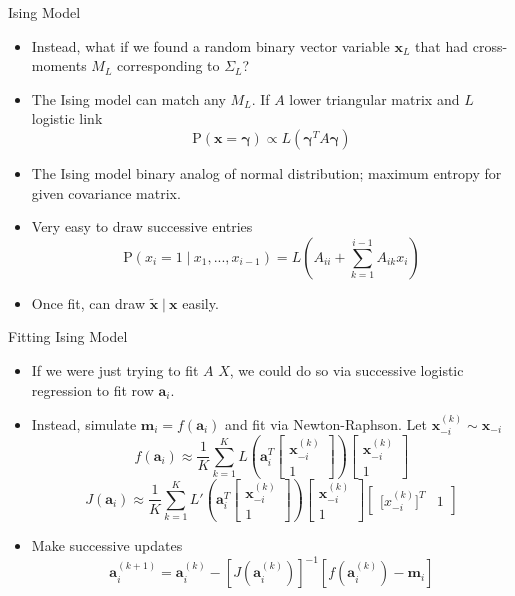 \documentclass{beamer}
\newcommand{\p}{\mathrm{P}}
\newcommand{\st}{ \; \big | \:}
\begin{document}
\begin{frame}{Ising Model}
    \begin{itemize}
        \item Instead, what if we found a random binary vector variable $\mathbf{x}_L$ that had cross-moments $M_L$ corresponding to $\Sigma_L$?
        \item The Ising model can match any $M_L$. If $A$ lower triangular matrix and $L$ logistic link
            \[ \p(\mathbf x=\mathbf \gamma) \propto L(\mathbf{\gamma}^T A\mathbf \gamma)\]
        \item The Ising model binary analog of normal distribution; maximum entropy for given covariance matrix.
        \item Very easy to draw successive entries
            \[ \p(x_{i}=1\st x_{1},...,x_{i-1}) = L\left(A_{ii}+\sum_{k=1}^{i-1}A_{ik}x_i\right) \]
        \item Once fit, can draw $\mathbf{\tilde x}\st \mathbf x$ easily.

    \end{itemize}
\end{frame}

\begin{frame}{Fitting Ising Model}
    \begin{itemize}
        \item If we were just trying to fit $A$ $X$, we could do so via successive logistic regression to fit row $\mathbf a_i$.
        \item Instead, simulate $\mathbf m_i = f(\mathbf a_i)$ and fit via Newton-Raphson. Let $\mathbf x_{-i}^{(k)}\sim \mathbf x_{-i}$
            \[f\left(\mathbf a_i\right) \approx \frac{1}{K}\sum_{k=1}^K L\left(\mathbf{a}_i^T\left[\begin{array}{c} \mathbf x_{-i}^{(k)} \\ 1 \end{array}\right]\right)\left[\begin{array}{c} \mathbf x_{-i}^{(k)} \\ 1 \end{array}\right] \]
            \[J\left( \mathbf a_i\right) \approx \frac{1}{K}\sum_{k=1}^K L'\left(\mathbf{a}_i^T\left[\begin{array}{c} \mathbf x_{-i}^{(k)} \\ 1 \end{array}\right]\right)\left[\begin{array}{c} \mathbf x_{-i}^{(k)} \\ 1 \end{array}\right]\left[\begin{array}{cc} \mathbf [x_{-i}^{(k)}]^T & 1 \end{array}\right] \]
        \item Make successive updates
            \[\mathbf a_i^{(k+1)} = \mathbf a_i^{(k)} - \left[J\left(\mathbf a_i^{(k)}\right) \right]^{-1}\left[f\left(\mathbf a_i^{(k)}\right)-\mathbf m_i\right] \]
    \end{itemize}
\end{frame}
\end{document}
